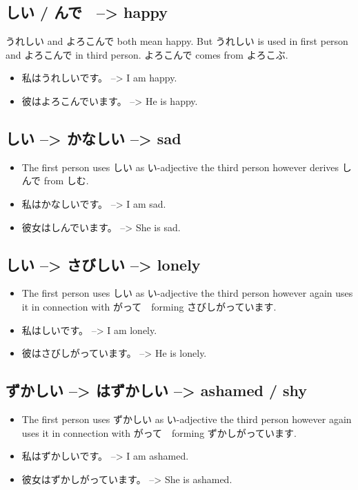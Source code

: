 \documentclass{article}
\begin{document}
\subsection{しい / んで　--> happy}
うれしい and よろこんで both mean happy. But うれしい is used in first person and よろこんで in third person.
よろこんで comes from よろこぶ.
\begin{itemize}
\item 私はうれしいです。 --> I am happy.
\item 彼はよろこんでいます。 --> He is happy.
\end{itemize}
\subsection{しい --> かなしい --> sad }
\begin{itemize}
\item The first person uses しい as い-adjective the third person however derives しんで from しむ.
\item 私はかなしいです。 --> I am sad.
\item 彼女はしんでいます。 --> She is sad.
\end{itemize}
\subsection{しい --> さびしい --> lonely }
\begin{itemize}
\item The first person uses しい as い-adjective the third person however again uses it in connection with がって　forming さびしがっています.
\item 私はしいです。 --> I am lonely.
\item 彼はさびしがっています。 --> He is lonely.
\end{itemize}
\subsection{ずかしい --> はずかしい --> ashamed / shy }
\begin{itemize}
\item The first person uses ずかしい as い-adjective the third person however again uses it in connection with がって　forming ずかしがっています.
\item 私はずかしいです。 --> I am ashamed.
\item 彼女はずかしがっています。 --> She is ashamed.
\end{itemize}
\end{document}
